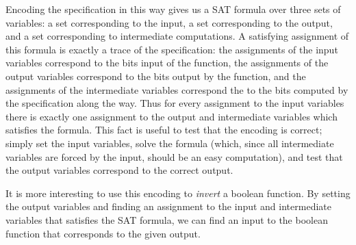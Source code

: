 Encoding the specification in this way gives us a SAT formula over three sets of variables: a set corresponding to the input, a set corresponding to the output, and a set corresponding to intermediate computations. A satisfying assignment of this formula is exactly a trace of the specification: the assignments of the input variables correspond to the bits input of the function, the assignments of the output variables correspond to the bits output by the function, and the assignments of the intermediate variables correspond the to the bits computed by the specification along the way. Thus for every assignment to the input variables there is exactly one assignment to the output and intermediate variables which satisfies the formula. This fact is useful to test that the encoding is correct; simply set the input variables, solve the formula (which, since all intermediate variables are forced by the input, should be an easy computation), and test that the output variables correspond to the correct output.

It is more interesting to use this encoding to \emph{invert} a boolean function. By setting the output variables and finding an assignment to the input and intermediate variables that satisfies the SAT formula, we can find an input to the boolean function that corresponds to the given output.